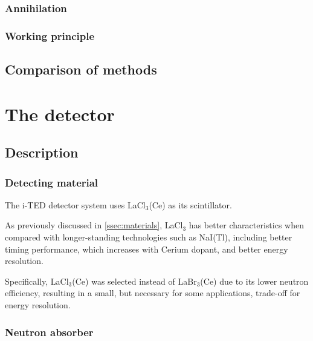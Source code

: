 \subsubsection{Annihilation}

\subsubsection{Working principle}

\subsection{Comparison of methods}

\section{The detector}

\subsection{Description}

\subsubsection{Detecting material}

The \ac{i-TED} detector system uses LaCl$_3$(Ce) as its scintillator.

As previously discussed in \ref{ssec:materials}, LaCl$_3$ has better characteristics when compared with longer-standing technologies such as NaI(Tl), including better timing performance, which increases with Cerium dopant, and better energy resolution.

Specifically, LaCl$_3$(Ce) was selected instead of LaBr$_3$(Ce) due to its lower neutron efficiency, resulting in a small, but necessary for some applications, trade-off for energy resolution.

\subsubsection{Neutron absorber}


